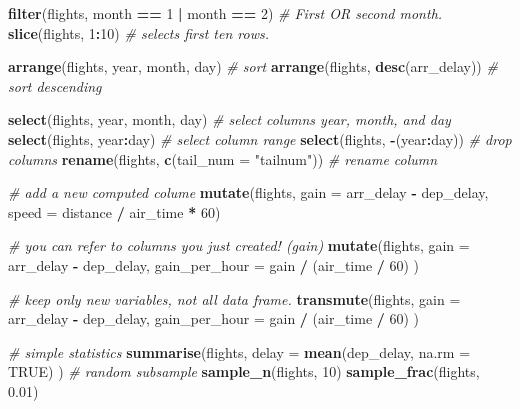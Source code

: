 \documentclass[]{book}
\newenvironment{Shaded}{\begin{snugshade}}{\end{snugshade}}
\newcommand{\CommentTok}[1]{\textcolor[rgb]{0.56,0.35,0.01}{\textit{#1}}}
\newcommand{\DataTypeTok}[1]{\textcolor[rgb]{0.13,0.29,0.53}{#1}}
\newcommand{\DecValTok}[1]{\textcolor[rgb]{0.00,0.00,0.81}{#1}}
\newcommand{\FloatTok}[1]{\textcolor[rgb]{0.00,0.00,0.81}{#1}}
\newcommand{\KeywordTok}[1]{\textcolor[rgb]{0.13,0.29,0.53}{\textbf{#1}}}
\newcommand{\NormalTok}[1]{#1}
\newcommand{\OperatorTok}[1]{\textcolor[rgb]{0.81,0.36,0.00}{\textbf{#1}}}
\newcommand{\OtherTok}[1]{\textcolor[rgb]{0.56,0.35,0.01}{#1}}
\newcommand{\StringTok}[1]{\textcolor[rgb]{0.31,0.60,0.02}{#1}}
\theoremstyle{definition}
\theoremstyle{definition}
\theoremstyle{definition}
\theoremstyle{remark}
\begin{document}
\begin{Shaded}
\begin{Highlighting}[]
\KeywordTok{filter}\NormalTok{(flights, month }\OperatorTok{==}\StringTok{ }\DecValTok{1} \OperatorTok{|}\StringTok{ }\NormalTok{month }\OperatorTok{==}\StringTok{ }\DecValTok{2}\NormalTok{) }\CommentTok{# First OR second month.}
\KeywordTok{slice}\NormalTok{(flights, }\DecValTok{1}\OperatorTok{:}\DecValTok{10}\NormalTok{) }\CommentTok{# selects first ten rows.}

\KeywordTok{arrange}\NormalTok{(flights, year, month, day) }\CommentTok{# sort}
\KeywordTok{arrange}\NormalTok{(flights, }\KeywordTok{desc}\NormalTok{(arr_delay)) }\CommentTok{# sort descending}

\KeywordTok{select}\NormalTok{(flights, year, month, day) }\CommentTok{# select columns year, month, and day}
\KeywordTok{select}\NormalTok{(flights, year}\OperatorTok{:}\NormalTok{day) }\CommentTok{# select column range}
\KeywordTok{select}\NormalTok{(flights, }\OperatorTok{-}\NormalTok{(year}\OperatorTok{:}\NormalTok{day)) }\CommentTok{# drop columns}
\KeywordTok{rename}\NormalTok{(flights, }\KeywordTok{c}\NormalTok{(}\DataTypeTok{tail_num =} \StringTok{"tailnum"}\NormalTok{)) }\CommentTok{# rename column}

\CommentTok{# add a new computed colume}
\KeywordTok{mutate}\NormalTok{(flights,}
  \DataTypeTok{gain =}\NormalTok{ arr_delay }\OperatorTok{-}\StringTok{ }\NormalTok{dep_delay,}
  \DataTypeTok{speed =}\NormalTok{ distance }\OperatorTok{/}\StringTok{ }\NormalTok{air_time }\OperatorTok{*}\StringTok{ }\DecValTok{60}\NormalTok{) }

\CommentTok{# you can refer to columns you just created! (gain)}
\KeywordTok{mutate}\NormalTok{(flights,}
  \DataTypeTok{gain =}\NormalTok{ arr_delay }\OperatorTok{-}\StringTok{ }\NormalTok{dep_delay,}
  \DataTypeTok{gain_per_hour =}\NormalTok{ gain }\OperatorTok{/}\StringTok{ }\NormalTok{(air_time }\OperatorTok{/}\StringTok{ }\DecValTok{60}\NormalTok{)}
\NormalTok{)}

\CommentTok{# keep only new variables, not all data frame.}
\KeywordTok{transmute}\NormalTok{(flights,}
  \DataTypeTok{gain =}\NormalTok{ arr_delay }\OperatorTok{-}\StringTok{ }\NormalTok{dep_delay,}
  \DataTypeTok{gain_per_hour =}\NormalTok{ gain }\OperatorTok{/}\StringTok{ }\NormalTok{(air_time }\OperatorTok{/}\StringTok{ }\DecValTok{60}\NormalTok{)}
\NormalTok{)}

\CommentTok{# simple statistics}
\KeywordTok{summarise}\NormalTok{(flights,}
  \DataTypeTok{delay =} \KeywordTok{mean}\NormalTok{(dep_delay, }\DataTypeTok{na.rm =} \OtherTok{TRUE}\NormalTok{)}
\NormalTok{  )}
\CommentTok{# random subsample }
\KeywordTok{sample_n}\NormalTok{(flights, }\DecValTok{10}\NormalTok{) }
\KeywordTok{sample_frac}\NormalTok{(flights, }\FloatTok{0.01}\NormalTok{) }
\end{Highlighting}
\end{Shaded}
\end{document}
